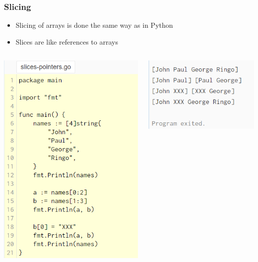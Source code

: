 \documentclass[14pt]{beamer}
\begin{document}
{
\begin{frame}
    \frametitle{Slicing}
    \begin{itemize}
        \item Slicing of arrays is done the same way as in Python
        \item Slices are like references to arrays
    \end{itemize}
    \begin{columns}
        \begin{column}{0.5\textwidth}
            \includegraphics[width=0.7\linewidth]{img/slices.PNG}
        \end{column}
        \begin{column}{0.5\textwidth}
            \includegraphics[width=0.7\linewidth]{img/slicesoutput.PNG}
        \end{column}
    \end{columns}
\end{frame}
}
\end{document}
